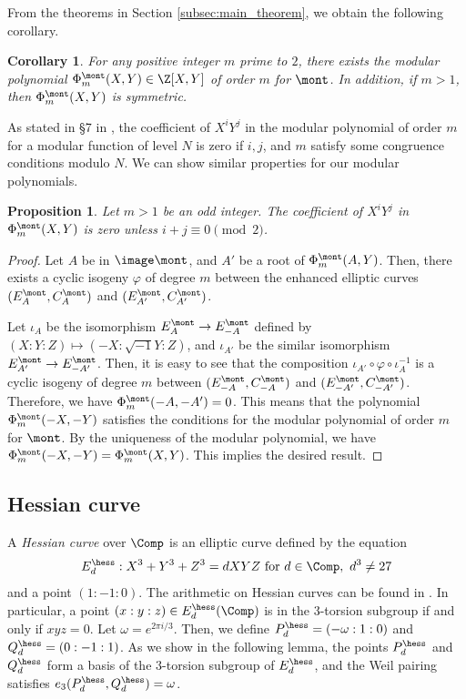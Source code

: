 \documentclass{amsart}
\newtheorem{proposition}[theorem]{Proposition}
\newtheorem{corollary}[theorem]{Corollary}
\theoremstyle{definition}
\theoremstyle{remark}
\numberwithin{equation}{section}
\begin{document}
From the theorems in Section \ref{subsec:main_theorem},
we obtain the following corollary.
\begin{corollary}
    For any positive integer $m$ prime to $2$,
    there exists the modular polynomial $\Phi_m^{\mont}(X, Y) \in \Z[X, Y]$
    of order $m$ for $\mont$.
    In addition, if $m > 1$,
    then $\Phi_m^{\mont}(X, Y)$ is symmetric.
\end{corollary}

As stated in \S 7 in \cite{broker2012modular},
the coefficient of $X^iY^j$ in the modular polynomial of order $m$ for a modular function of level $N$
is zero if $i, j$, and $m$ satisfy some congruence conditions modulo $N$.
We can show similar properties for our modular polynomials.
\begin{proposition}\label{prop:coeff_zero_montgomery}
    Let $m > 1$ be an odd integer.
    The coefficient of $X^i Y^j$ in $\Phi_m^{\mont}(X, Y)$
    is zero unless $i + j \equiv 0 \pmod{2}$.
\end{proposition}
\begin{proof}
    Let $A$ be in $\image\mont$,
    and $A'$ be a root of $\Phi_m^{\mont}(A, Y)$.
    Then, there exists a cyclic isogeny $\varphi$ of degree $m$
    between the enhanced elliptic curves
    $(E_A^\mont, C_A^\mont)$ and $(E_{A'}^\mont, C_{A'}^\mont)$.
    
    Let $\iota_A$ be the isomorphism $E_A^\mont \to E_{-A}^\mont$
    defined by $(X : Y : Z) \mapsto (-X : \sqrt{-1} Y : Z)$,
    and $\iota_{A'}$ be the similar isomorphism $E_{A'}^\mont \to E_{-A'}^\mont$.
    Then, it is easy to see that
    the composition $\iota_{A'} \circ \varphi \circ \iota_A^{-1}$
    is a cyclic isogeny of degree $m$
    between $(E_{-A}^\mont, C_{-A}^\mont)$ and $(E_{-A'}^\mont, C_{-A'}^\mont)$.
    Therefore, we have $\Phi_m^{\mont}(-A, -A') = 0$.
    This means that the polynomial $\Phi_m^{\mont}(-X, -Y)$
    satisfies the conditions for the modular polynomial of order $m$ for $\mont$.
    By the uniqueness of the modular polynomial,
    we have $\Phi_m^{\mont}(-X, -Y) = \Phi_m^{\mont}(X, Y)$.
    This implies the desired result.
\end{proof}

\subsection{Hessian curve}\label{subsec:hessian}
A \emph{Hessian curve} over $\Comp$ is an elliptic curve defined by
the equation
\begin{equation*}
    E_d^\hess : X^3 + Y^3 + Z^3 = d XYZ \text{ for } d \in \Comp,\ d^3 \neq 27
\end{equation*}
and a point $(1 : -1 : 0)$.
The arithmetic on Hessian curves
can be found in \cite[\S 2.1]{PKC:FarJoy10}.
In particular,
a point $(x : y : z) \in E_d^\hess(\Comp)$ is in the $3$-torsion subgroup
if and only if $xyz = 0$.
Let $\omega = e^{2\pi i / 3}$.
Then,
we define
$P_d^\hess = (-\omega : 1 : 0)$
and
$Q_d^\hess = (0 : -1 : 1)$.
As we show in the following lemma,
the points $P_d^\hess$ and $Q_d^\hess$
form a basis of the $3$-torsion subgroup of $E_d^\hess$,
and the Weil pairing satisfies $e_3(P_d^\hess, Q_d^\hess) = \omega$.
\end{document}

